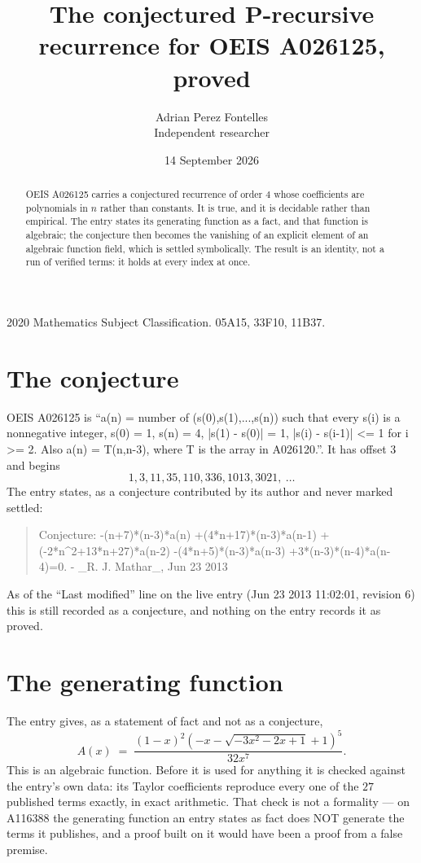 \documentclass[11pt,a4paper]{article}
\title{The conjectured P-recursive recurrence for OEIS A026125, proved}
\author{Adrian Perez Fontelles\\ \small Independent researcher}
\date{14 September 2026}
\theoremstyle{plain}
\theoremstyle{definition}
\begin{document}
\maketitle

\begin{abstract}
OEIS A026125 carries a conjectured recurrence of order $4$ whose coefficients are polynomials in
$n$ rather than constants. It is true, and it is decidable rather than empirical. The entry
states its generating function as a fact, and that function is algebraic; the conjecture then
becomes the vanishing of an explicit element of an algebraic function field, which is settled
symbolically. The result is an identity, not a run of verified terms: it holds at every index
at once.
\end{abstract}

\noindent\small 2020 Mathematics Subject Classification. 05A15, 33F10, 11B37.\normalsize

\section{The conjecture}

OEIS A026125 is ``a(n) = number of (s(0),s(1),...,s(n)) such that every s(i) is a nonnegative integer, s(0) = 1, s(n) = 4, |s(1) - s(0)| = 1, |s(i) - s(i-1)| <= 1 for i >= 2. Also a(n) = T(n,n-3), where T is the array in A026120.''. It has offset $3$ and begins
\[
1, 3, 11, 35, 110, 336, 1013, 3021,\ \dots
\]
The entry states, as a conjecture contributed by its author and never marked settled:
\begin{quote}\raggedright\small
Conjecture: -(n+7)*(n-3)*a(n) +(4*n+17)*(n-3)*a(n-1) +(-2*n\^{}2+13*n+27)*a(n-2) -(4*n+5)*(n-3)*a(n-3) +3*(n-3)*(n-4)*a(n-4)=0. - \_R. J. Mathar\_, Jun 23 2013
\end{quote}
As of the ``Last modified'' line on the live entry (Jun 23 2013 11:02:01, revision 6)
this is still recorded as a conjecture, and nothing on the entry records it as proved.

\section{The generating function}

The entry gives, as a statement of fact and not as a conjecture,
\[
A(x)\;=\;\frac{\left(1 - x\right)^{2} \left(- x - \sqrt{- 3 x^{2} - 2 x + 1} + 1\right)^{5}}{32 x^{7}} .
\]
This is an algebraic function. Before it is used for anything it is checked against the entry's
own data: its Taylor coefficients reproduce every one of the $27$ published terms
exactly, in exact arithmetic. That check is not a formality --- on A116388 the generating
function an entry states as fact does NOT generate the terms it publishes, and a proof built on
it would have been a proof from a false premise.
\end{document}
